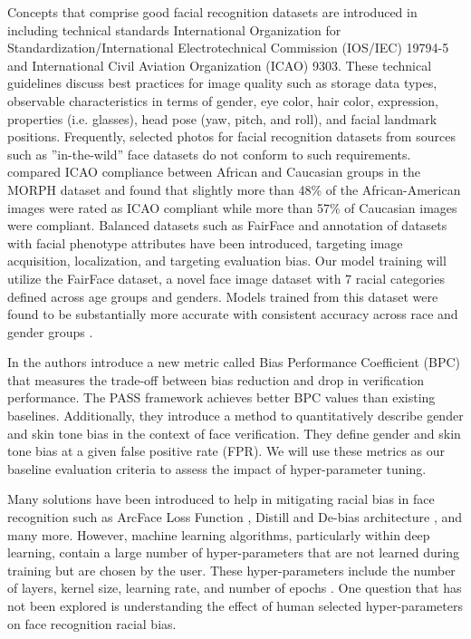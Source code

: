 \documentclass[conference]{IEEEtran}
\begin{document}
Concepts that comprise good facial recognition datasets are introduced in \cite{monnerat2007machine} including technical standards International Organization for Standardization/International Electrotechnical Commission (IOS/IEC) 19794-5 and International Civil Aviation Organization (ICAO) 9303. These technical guidelines discuss best practices for image quality such as storage data types, observable characteristics in terms of gender, eye color, hair color, expression, properties (i.e. glasses), head pose (yaw, pitch, and roll), and facial landmark positions. Frequently, selected photos for facial recognition datasets from sources such as ”in-the-wild” face datasets do not conform to such requirements. \cite{vangara2019characterizing} compared ICAO compliance between African and Caucasian groups in the MORPH \cite{ricanek2006morph} dataset and found that slightly more than 48\% of the African-American images were rated as ICAO compliant while more than 57\% of Caucasian images were compliant. Balanced datasets such as FairFace \cite{karkkainen2021fairface} and annotation of datasets with facial phenotype attributes \cite{yucer2022measuring} have been introduced, targeting image acquisition, localization, and targeting evaluation bias. Our model training will utilize the FairFace dataset, a novel face image dataset with 7 racial categories defined across age groups and genders. Models trained from this dataset were found to be substantially more accurate with consistent accuracy across race and gender groups \cite{karkkainen2021fairface}.

In \cite{dhar2021pass} the authors introduce a new metric called Bias Performance Coefficient (BPC) that measures the trade-off between bias reduction and drop in verification performance. The PASS framework achieves better BPC values than existing baselines. Additionally, they introduce a method to quantitatively describe gender and skin tone bias in the context of face verification. They define gender and skin tone bias at a given false positive rate (FPR). We will use these metrics as our baseline evaluation criteria to assess the impact of hyper-parameter tuning.

Many solutions have been introduced to help in mitigating racial bias in face recognition such as ArcFace Loss Function \cite{deng2019arcface}, Distill and De-bias architecture \cite{dhar2022distill}, and many more. However, machine learning algorithms, particularly within deep learning, contain a large number of hyper-parameters that are not learned during training but are chosen by the user. These hyper-parameters include the number of layers, kernel size, learning rate, and number of epochs \cite{hellstrom2020bias}. One question that has not been explored is understanding the effect of human selected hyper-parameters on face recognition racial bias.
\end{document}
